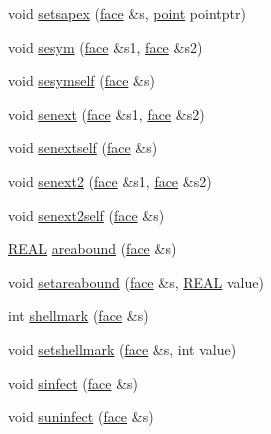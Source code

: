 \begin{DoxyCompactItemize}
\item 
void \hyperlink{classtetgenmesh_a6ffcca92e06edb606c952d7f76b89303}{setsapex} (\hyperlink{classtetgenmesh_1_1face}{face} \&s, \hyperlink{classtetgenmesh_ace3fb4f80389185b7c9b18ab69a3dea2}{point} pointptr)
\item 
void \hyperlink{classtetgenmesh_a1bedefbd18d6844450dd33911ff27ba8}{sesym} (\hyperlink{classtetgenmesh_1_1face}{face} \&s1, \hyperlink{classtetgenmesh_1_1face}{face} \&s2)
\item 
void \hyperlink{classtetgenmesh_a867b8f5e8312c7a918eb96813a6f6de7}{sesymself} (\hyperlink{classtetgenmesh_1_1face}{face} \&s)
\item 
void \hyperlink{classtetgenmesh_a5e0c9efed1fb3a19ed5c2b0721086840}{senext} (\hyperlink{classtetgenmesh_1_1face}{face} \&s1, \hyperlink{classtetgenmesh_1_1face}{face} \&s2)
\item 
void \hyperlink{classtetgenmesh_aec1136555f9371102995738aabe1e552}{senextself} (\hyperlink{classtetgenmesh_1_1face}{face} \&s)
\item 
void \hyperlink{classtetgenmesh_a9e2a0e8ac94c6273dd98c83b6c4bb0d9}{senext2} (\hyperlink{classtetgenmesh_1_1face}{face} \&s1, \hyperlink{classtetgenmesh_1_1face}{face} \&s2)
\item 
void \hyperlink{classtetgenmesh_a6d153db2af792b8c6e37fb4fee187f47}{senext2self} (\hyperlink{classtetgenmesh_1_1face}{face} \&s)
\item 
\hyperlink{tetgen_8h_a4b654506f18b8bfd61ad2a29a7e38c25}{R\-E\-A\-L} \hyperlink{classtetgenmesh_a589cf429e209ed7575602ede3d158d93}{areabound} (\hyperlink{classtetgenmesh_1_1face}{face} \&s)
\item 
void \hyperlink{classtetgenmesh_a0f80088cbe127eeac6995e365d10eb06}{setareabound} (\hyperlink{classtetgenmesh_1_1face}{face} \&s, \hyperlink{tetgen_8h_a4b654506f18b8bfd61ad2a29a7e38c25}{R\-E\-A\-L} value)
\item 
int \hyperlink{classtetgenmesh_ab5a2f1e0884a200fc6152ec15c2531d9}{shellmark} (\hyperlink{classtetgenmesh_1_1face}{face} \&s)
\item 
void \hyperlink{classtetgenmesh_aebfb8c5f527b8145bf96d2709993c59d}{setshellmark} (\hyperlink{classtetgenmesh_1_1face}{face} \&s, int value)
\item 
void \hyperlink{classtetgenmesh_aa417a432076c7de138fed761c5322f4f}{sinfect} (\hyperlink{classtetgenmesh_1_1face}{face} \&s)
\item 
void \hyperlink{classtetgenmesh_a511f009f29bef3d614063e9c174bc677}{suninfect} (\hyperlink{classtetgenmesh_1_1face}{face} \&s)

\end{DoxyCompactItemize}
